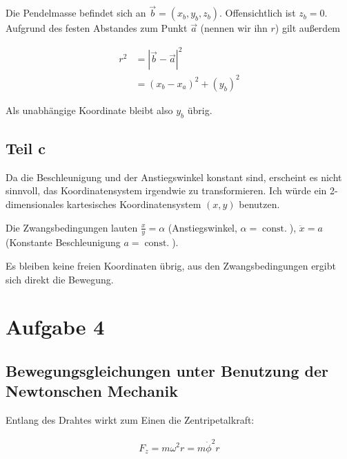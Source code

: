 \documentclass[a4paper,german,12pt,smallheadings]{scrartcl}
\begin{document}
Die Pendelmasse befindet sich an $\vec{b} = (x_b, y_b, z_b)$. Offensichtlich
ist $z_b = 0$. Aufgrund des festen Abstandes zum Punkt $\vec{a}$ (nennen wir
ihn $r$) gilt außerdem

\begin{align*}
  r^2 &= |\vec{b} - \vec{a}|^2 \\
    &= (x_b-x_a)^2 + (y_b)^2
\end{align*}

Als unabhängige Koordinate bleibt also $y_b$ übrig.


\subsection*{Teil c}
Da die Beschleunigung und der Anstiegswinkel konstant sind, erscheint es nicht
sinnvoll, das Koordinatensystem irgendwie zu transformieren. Ich würde ein
2-dimensionales kartesisches Koordinatensystem $(x, y)$ benutzen.

Die Zwangsbedingungen lauten $\frac{x}{y} = \alpha$ (Anstiegswinkel, $\alpha =
\operatorname{const.}$), $\ddot{x} = a$ (Konstante Beschleunigung $a =
\operatorname{const.}$).

Es bleiben keine freien Koordinaten übrig, aus den Zwangsbedingungen ergibt
sich direkt die Bewegung.

\section*{Aufgabe 4}

\subsection*{Bewegungsgleichungen unter Benutzung der Newtonschen Mechanik}

Entlang des Drahtes wirkt zum Einen die Zentripetalkraft:

\begin{align*}
  F_z = m \omega^2 r = m \dot{\phi}^2 r
\end{align*}
\end{document}
